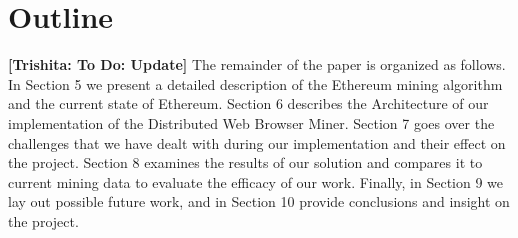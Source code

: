 \documentclass[runningheads]{llncs}
\newcommand{\trishita}[1]{{\color{magenta}\bfseries[Trishita: #1]}}
\begin{document}


\section{Outline}
\trishita{To Do: Update}
The remainder of the paper is organized as follows. In Section 5 we present a detailed description of the Ethereum mining algorithm and the current state of Ethereum. Section 6 describes the Architecture of our implementation of the Distributed Web Browser Miner. Section 7 goes over the challenges that we have dealt with during our implementation and their effect on the project. Section 8 examines the results of our solution and compares it to current mining data to evaluate the efficacy of our work. Finally, in Section 9 we lay out possible future work, and in Section 10 provide conclusions and insight on the project.
\end{document}
